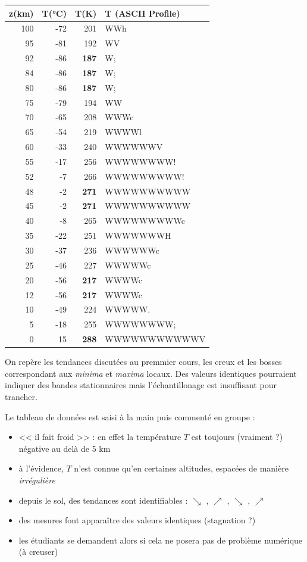 \documentclass[letterpaper, 11pt]{article}
\begin{document}
\begin{itemize}
\begin{table}[htbp]
\label{name}
\centering
\begin{tabular}{rrrl}
z(km) & T(°C) & T(K) & T (ASCII Profile)\\
\hline
100 & -72 & 201 & WWh\\
95 & -81 & 192 & WV\\
92 & -86 & \textbf{187} & W;\\
84 & -86 & \textbf{187} & W;\\
80 & -86 & \textbf{187} & W;\\
75 & -79 & 194 & WW\\
70 & -65 & 208 & WWWc\\
65 & -54 & 219 & WWWWl\\
60 & -33 & 240 & WWWWWWV\\
55 & -17 & 256 & WWWWWWWW!\\
52 & -7 & 266 & WWWWWWWWW!\\
48 & -2 & \textbf{271} & WWWWWWWWWW\\
45 & -2 & \textbf{271} & WWWWWWWWWW\\
40 & -8 & 265 & WWWWWWWWWc\\
35 & -22 & 251 & WWWWWWWH\\
30 & -37 & 236 & WWWWWWc\\
25 & -46 & 227 & WWWWWc\\
20 & -56 & \textbf{217} & WWWWc\\
12 & -56 & \textbf{217} & WWWWc\\
10 & -49 & 224 & WWWWW.\\
5 & -18 & 255 & WWWWWWWW;\\
0 & 15 & \textbf{288} & WWWWWWWWWWWV\\
\end{tabular}
\end{table}

On repère les tendances discutées au premmier cours, les creux et les bosses correspondant aux \emph{minima} et \emph{maxima} locaux. Des valeurs identiques pourraient indiquer des bandes stationnaires mais l'échantillonage est insuffisant pour trancher.

Le tableau de données est saisi à la main puis commenté en groupe : 

\begin{itemize}
\item << il fait froid >> : en effet la température \(T\) est  toujours (vraiment ?) négative au delà de 5 km
\item à l'évidence, \(T\) n'est connue qu'en certaines altitudes, espacées de manière \emph{irrégulière}
\item depuis le sol, des tendances sont identifiables : \(\searrow\) , \(\nearrow\) , \(\searrow\) , \(\nearrow\)
\item des mesures font apparaître des valeurs identiques (stagnation ?)
\item les étudiants se demandent alors si cela ne posera pas de problème numérique (à creuser)
\end{itemize}


\end{itemize}
\end{document}
